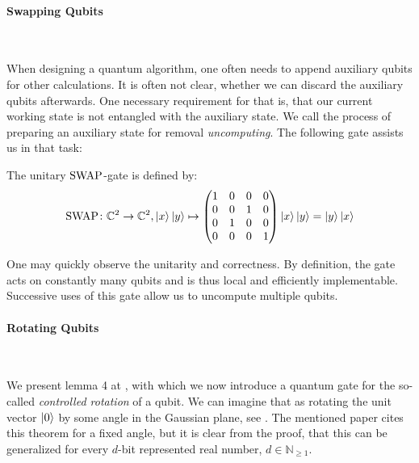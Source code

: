 \paragraph*{Swapping Qubits} \phantom{}\\\phantom{}

When designing a quantum algorithm, one often needs to append auxiliary qubits for other calculations. It is often not clear, whether we can discard the auxiliary qubits afterwards. One necessary requirement for that is, that our current working state is not entangled with the auxiliary state. We call the process of preparing an auxiliary state for removal \emph{uncomputing}. The following gate assists us in that task:

\begin{definition} \label{swap_gate}
    The unitary \(\operatorname{SWAP}\)-gate is defined by:
    \begin{align}
        \swapgate\colon \mathbb{C}^2 \to \mathbb{C}^2, \ket{x}\ket{y} \mapsto \begin{pmatrix*}
            1 & 0 & 0 & 0\\
            0 & 0 & 1 & 0\\
            0 & 1 & 0 & 0\\
            0 & 0 & 0 & 1
        \end{pmatrix*} \ket{x}\ket{y} = \ket{y}\ket{x}
    \end{align}
\end{definition}

One may quickly observe the unitarity and correctness. By definition, the gate acts on constantly many qubits and is thus local and efficiently implementable. Successive uses of this gate allow us to uncompute multiple qubits.

\paragraph*{Rotating Qubits} \phantom{}\\\phantom{}

We present lemma 4 at \cite[p. 25]{Dervovic2018}, with which we now introduce a quantum gate for the so-called \emph{controlled rotation} of a qubit. We can imagine that as rotating the unit vector \(\ket{0}\) by some angle in the Gaussian plane, see . The mentioned paper cites this theorem for a fixed angle, but it is clear from the proof, that this can be generalized for every \(d\)-bit represented real number, \(d \in \mathbb{N}_{\geq 1}\).

